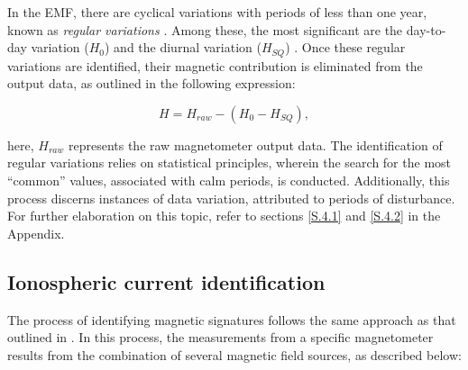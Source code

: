 \documentclass[12pt]{article}
\begin{document}
In the EMF, there are cyclical variations with periods of less than one year, known as \emph{regular variations} \citep{l_handbook_geof_sw_Geom_field}. Among these, the most significant are the day-to-day variation ($H_0$) and the diurnal variation ($H_{SQ}$) \citep{baseline_Gjerloev, vanKampt}. Once these regular variations are identified, their magnetic contribution is eliminated from the output data, as outlined in the following expression:

\begin{equation}
	\label{eq:lineabase}
	H = H_{raw} - (H_0-H_{SQ}), 
\end{equation}

\noindent here, $H_{raw}$ represents the raw magnetometer output data. The identification of regular variations relies on statistical principles, wherein the search for the most ``common'' values, associated with calm periods, is conducted. Additionally, this process discerns instances of data variation, attributed to periods of disturbance. For further elaboration on this topic, refer to sections \ref{S.4.1} and \ref{S.4.2} in the Appendix.

\subsection{Ionospheric current identification}

The process of identifying magnetic signatures follows the same approach as that outlined in \cite{ddyn2005, amorymazaudier_2017, amory2020_filtros}. In this process, the measurements from a specific magnetometer results from the combination of several magnetic field sources, as described below:
\end{document}
